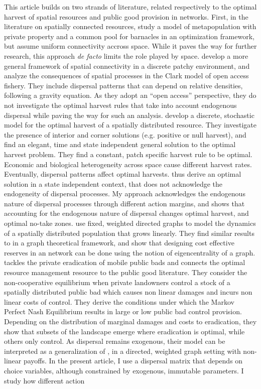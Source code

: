 \documentclass{article}
\begin{document}
This article builds on two strands of literature, related respectively to the optimal harvest of spatial resources and public good provision in networks.
First, in the literature on spatially connected resources, \cite{brown_metapopulation_1997} study a model of metapopulation with private property and a common pool for barnacles in an optimization framework, but assume uniform connectivity accross space. While it paves the way for further research, this approach \textit{de facto} limits the role played by space. \cite{sanchirico_bioeconomics_1999} develop a more general framework of spatial connectivity in a discrete patchy environment, and analyze the consequences of spatial processes in the Clark model of open access fishery. They include dispersal patterns that can depend on relative densities, following a gravity equation. As they adopt an \enquote{open access} perspective, they do not investigate the optimal harvest rules that take into account endogenous dispersal while paving the way for such an analysis. \cite{costello_optimal_2008} develop a discrete, stochastic model for the optimal harvest of a spatially distributed resource. They investigate the presence of interior and corner solutions (e.g. positive or null harvest), and find an elegant, time and state independent general solution to the optimal harvest problem. They find a constant, patch specific harvest rule to be optimal. Economic and biological heterogeneity across space cause different harvest rates. Eventually, dispersal patterns affect optimal harvests. \cite{costello_optimal_2008} thus derive an optimal solution in a state independent context, that does not acknowledge the endogeneity of dispersal processes. My approach acknowledges the endogenous nature of dispersal processes through different action margins, and shows that accounting for the endogenous nature of dispersal changes optimal harvest, and optimal no-take zones. \cite{fabbri_competition_2022} use fixed, weighted directed graphs to model the dynamics of a spatially distributed population that grows linearly. They find similar results to \cite{costello_optimal_2008} in a graph theoretical framework, and show that designing cost effective reserves in an network can be done using the notion of eigencentrality of a graph.  \cite{costello_private_2017} tackles the private eradication of mobile public bads and connects the optimal resource management resource to the public good literature. They consider the non-cooperative equilibrium when private landowners control a stock of a spatially distributed public bad which causes non linear damages and incurs non linear costs of control. They derive the conditions under which the Markov Perfect Nash Equilibrium results in large or low public bad control provision. Depending on the distribution of marginal damages and costs to eradication, they show that subsets of the landscape emerge where eradication is optimal, while others only control. As dispersal remains exogenous, their model can be interpreted as a generalization of \cite{bramoulle_public_2007}, in a directed, weighted graph setting with non-linear payoffs. In the present article, I use a dispersal matrix that depends on choice variables, although constrained by exogenous, immutable parameters. I study how different action 
\end{document}
